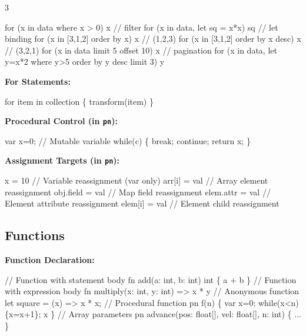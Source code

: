 \documentclass[8pt,landscape,a4paper,oneside]{article}
\newenvironment{Shaded}{%
  \begin{snugshade}%
  \vspace{0.4\baselineskip}%
  \fontsize{9}{10}\selectfont%
  \setlength{\parskip}{0pt}%
  \setlength{\topsep}{0pt}%
  \setlength{\partopsep}{0pt}%
}{%
  \vspace{0.01\baselineskip}%
  \end{snugshade}%
}
\newcommand{\NormalTok}[1]{#1}
\begin{document}
\begin{multicols*}{3}
\begin{Shaded}
\begin{Highlighting}[]
\NormalTok{for (x in data where x \textgreater{} 0) x           // filter}
\NormalTok{for (x in data, let sq = x*x) sq        // let binding}
\NormalTok{for (x in [3,1,2] order by x) x         // (1,2,3)}
\NormalTok{for (x in [3,1,2] order by x desc) x    // (3,2,1)}
\NormalTok{for (x in data limit 5 offset 10) x     // pagination}
\NormalTok{for (x in data, let y=x*2}
\NormalTok{    where y\textgreater{}5 order by y desc limit 3) y}
\end{Highlighting}
\end{Shaded}

\textbf{For Statements:}

\begin{Shaded}
\begin{Highlighting}[]
\NormalTok{for item in collection \{ transform(item) \}}
\end{Highlighting}
\end{Shaded}

\textbf{Procedural Control (in \texttt{pn}):}

\begin{Shaded}
\begin{Highlighting}[]
\NormalTok{var x=0;   // Mutable variable}
\NormalTok{while(c) \{ break;  continue;  return x; \}}
\end{Highlighting}
\end{Shaded}

\textbf{Assignment Targets (in \texttt{pn}):}

\begin{Shaded}
\begin{Highlighting}[]
\NormalTok{x = 10              // Variable reassignment (var only)}
\NormalTok{arr[i] = val        // Array element reassignment}
\NormalTok{obj.field = val     // Map field reassignment}
\NormalTok{elem.attr = val     // Element attribute reassignment}
\NormalTok{elem[i] = val       // Element child reassignment}
\end{Highlighting}
\end{Shaded}

\subsection{Functions}\label{functions}

\textbf{Function Declaration:}

\begin{Shaded}
\begin{Highlighting}[]
\NormalTok{// Function with statement body}
\NormalTok{fn add(a: int, b: int) int \{ a + b \}}
\NormalTok{// Function  with expression body}
\NormalTok{fn multiply(x: int, y: int) =\textgreater{} x * y}
\NormalTok{// Anonymous function}
\NormalTok{let square = (x) =\textgreater{} x * x;}
\NormalTok{// Procedural function}
\NormalTok{pn f(n) \{ var x=0; while(x\textless{}n) \{x=x+1\}; x \}}
\NormalTok{// Array parameters}
\NormalTok{pn advance(pos: float[], vel: float[], n: int) \{ ... \}}
\end{Highlighting}
\end{Shaded}


\end{multicols*}
\end{document}
